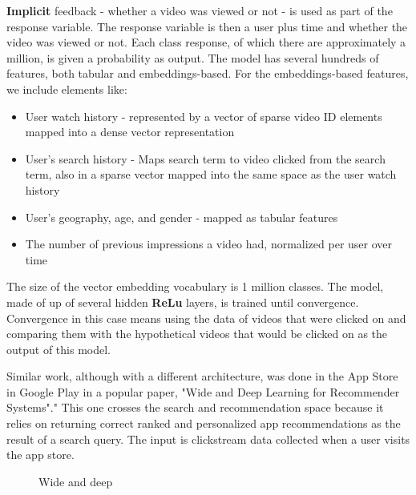 \documentclass[11pt, table]{diazessay} %
\begin{document}
\begin{sloppypar}
\textbf{Implicit} feedback - whether a video was viewed or not - is used as part of the response variable. The response variable is then a user plus time and whether the video was viewed or not. Each class response, of which there are approximately a million, is given a probability as output.  The model has several hundreds of features, both tabular and embeddings-based. For the embeddings-based features, we include elements like: 

\begin{itemize}
  \item User watch history - represented by a vector of sparse video ID elements mapped into a dense vector representation
  \item User's search history - Maps search term to video clicked from the search term, also in a sparse vector mapped into the same space as the user watch history 
  \item User's geography, age, and gender - mapped as tabular features
  \item The number of previous impressions a video had, normalized per user over time
\end{itemize}

The size of the vector embedding vocabulary is 1 million classes. The model, made of up of several hidden \textbf{ReLu} layers, is trained until convergence. Convergence in this case means using the data of videos that were clicked on and comparing them with the hypothetical videos that would be clicked on as the output of this model. 

Similar work, although with a different architecture, was done in the App Store in Google Play in a popular paper, "Wide and Deep Learning for Recommender Systems"\citep{cheng2016wide}." This one crosses the search and recommendation space because it relies on returning correct ranked and personalized app recommendations as the result of a search query.  The input is clickstream  data collected when a user visits the app store. 


\begin{figure}[H]
\caption{Wide and deep\citep{cheng2016wide}}
\end{figure}


\end{sloppypar}
\end{document}
